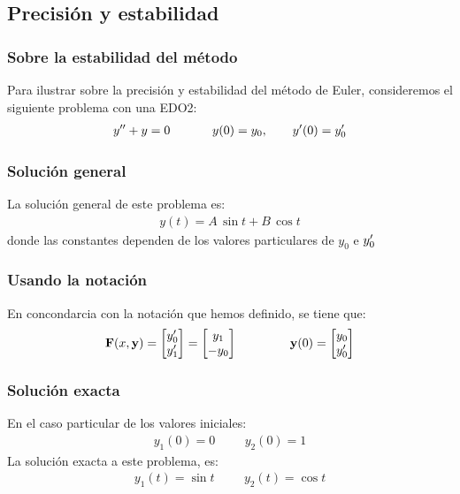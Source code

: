 \documentclass[12pt]{beamer}
\begin{document}
\subsection{Precisión y estabilidad}

\begin{frame}
\frametitle{Sobre la estabilidad del método}
Para ilustrar sobre la precisión y estabilidad del método de Euler, consideremos el siguiente problema con una EDO2:
\pause
\begin{align*}
{y}^{\prime \prime} + y = 0 \hspace{1.2cm} y (0) = y_{0}, \hspace{0.7cm} {y}^{\prime} (0) = {y}^{\prime}_{0}
\end{align*}
\end{frame}
\begin{frame}
\frametitle{Solución general}
La solución general de este problema es:
\pause
\begin{align*}
y (t) = A \, \sin t + B \, \cos t
\end{align*}
\pause
donde las constantes dependen de los valores particulares de $y_{0}$ e ${y}^{\prime}_{0}$
\end{frame}
\begin{frame}
\frametitle{Usando la notación}
En concondarcia con la notación que hemos definido, se tiene que:
\pause
\begin{align*}
\mathbf{F} (x, \mathbf{y}) = 
\begin{bmatrix}
{y}^{\prime}_{0} \\
{y}^{\prime}_{1}
\end{bmatrix} =
\begin{bmatrix}
y_{1} \\
- y_{0}
\end{bmatrix}
\hspace{1.5cm}
\mathbf{y} (0) = 
\begin{bmatrix}
y_{0} \\
{y}^{\prime}_{0}
\end{bmatrix}
\end{align*}
\end{frame}
\begin{frame}
\frametitle{Solución exacta}
En el caso particular de los valores iniciales:
\pause
\begin{align*}
y_{1} (0) = 0 \hspace{1cm} y_{2} (0) = 1
\end{align*}
\pause
La solución exacta a este problema, es:
\pause
\begin{align*}
y_{1} (t) = \sin t \hspace{1cm} y_{2} (t) = \cos t
\end{align*}
\end{frame}
\end{document}
